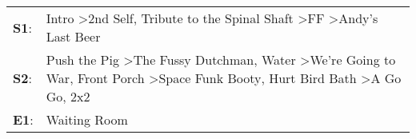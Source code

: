 \begin{supertabular}{p{0.03\textwidth}p{0.92\textwidth}}
 \textbf{S1}:  &                                                                                                                                                                                Intro\textsuperscript{} \textgreater \enspace 2nd Self\textsuperscript{}, \enspace Tribute to the Spinal Shaft\textsuperscript{} \textgreater \enspace FF\textsuperscript{} \textgreater \enspace Andy's Last Beer\textsuperscript{}  \enspace  \\
 \textbf{S2}:  &  Push the Pig\textsuperscript{} \textgreater \enspace The Fussy Dutchman\textsuperscript{}, \enspace Water\textsuperscript{} \textgreater \enspace We're Going to War\textsuperscript{}, \enspace Front Porch\textsuperscript{} \textgreater \enspace Space Funk Booty\textsuperscript{}, \enspace Hurt Bird Bath\textsuperscript{} \textgreater \enspace A Go Go\textsuperscript{}, \enspace 2x2\textsuperscript{}  \enspace  \\
 \textbf{E1}:  &                                                                                                                                                                                                                                                                                                                                                                                      Waiting Room\textsuperscript{}  \enspace  \\
\end{supertabular}
